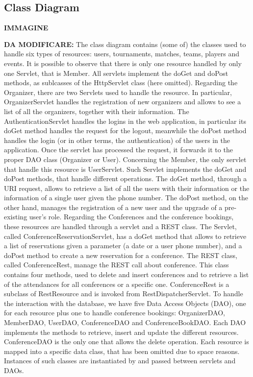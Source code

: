 \subsection{Class Diagram}

\textbf{IMMAGINE}

\textbf{DA MODIFICARE:}
The class diagram contains (some of) the classes used to handle six types of resources: users, tournaments, matches, teams, players and events. It is possible to observe that there is only one resource
handled by only one Servlet, that is Member. All servlets implement the doGet and doPost methods,
as sublcasses of the HttpServlet class (here omitted).
Regarding the Organizer, there are two Servlets used to handle the resource.
In particular, OrganizerServlet handles the registration of new organizers and allows to see a list of
all the organizers, together with their information. The AuthenticationServlet handles the logins in
the web application, in particular its doGet method handles the request for the logout, meanwhile
the doPost method handles the login (or in other terms, the authentication) of the users in the
application. Once the servlet has processed the request, it forwards it to the proper DAO class
(Organizer or User). Concerning the Member, the only servlet that handle this resource is UserServlet.
Such Servlet implements the doGet and doPost methods, that handle different operations. The doGet
method, through a URI request, allows to retrieve a list of all the users with their information or the
information of a single user given the phone number. The doPost method, on the other hand,
manages the registration of a new user and the upgrade of a pre-existing user’s role. Regarding the
Conferences and the conference bookings, these resources are handled through a servlet and a REST
class. The Servlet, called ConferenceReservationServlet, has a doGet method that allows to retrieve
a list of reservations given a parameter (a date or a user phone number), and a doPost method to
create a new reservation for a conference. The REST class, called ConferenceRest, manage the REST
call about conference. This class contains four methods, used to delete and insert conferences and
to retrieve a list of the attendances for all conferences or a specific one. ConferenceRest is a subclass of RestResource and is invoked from RestDispatcherServlet.
To handle the interaction with the database, we have five Data Access Objects (DAO), one for each
resource plus one to handle conference bookings: OrganizerDAO, MemberDAO, UserDAO,
ConferenceDAO and ConferenceBookDAO. Each DAO implements the methods to retrieve, insert and
update the different resources. ConferenceDAO is the only one that allows the delete operation.
Each resource is mapped into a specific data class, that has been omitted due to space reasons.
Instances of such classes are instantiated by and passed between servlets and DAOs.
